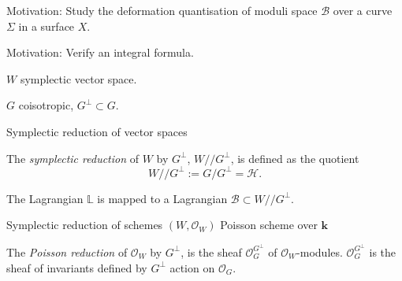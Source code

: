     \frame{\sectionpage}
    
    \begin{frame}
    Motivation: Study the deformation quantisation of moduli space \(\mathcal{B}\) over a curve \(\Sigma\) in a surface \(X\).
    
    \vspace{1em}
    
    Motivation: Verify an integral formula.
    \end{frame}



    \begin{frame}
    \(W\) symplectic vector space.
    
    \(G\) coisotropic, \(G^{\perp} \subset G\).
    \end{frame}


    \begin{frame}{Symplectic reduction of vector spaces}
    
    \begin{defn} The \emph{symplectic reduction} of \(W\) by \(G^{\perp}\), \(W /\!\!/ G^{\perp}\), is defined as the quotient 
    \[ W /\!\!/ G^{\perp} := G/G^\perp = \mathcal{H}. \]
    \end{defn}
    
    \begin{lem} 
    The Lagrangian \( \mathbb{L}\) is mapped to a Lagrangian \( \mathcal{B}  \subset  W /\!\!/ G^{\perp} \). 
    \end{lem}

    
    \end{frame}
    
    
    \begin{frame}{Symplectic reduction of schemes}
    \( (W, \mathcal{O}_W)\) Poisson scheme over \( \mathbf{k}\)

    
    \begin{defn}
    The \emph{Poisson reduction} of \( \mathcal{O}_W\) by \(G^{\perp}\), is the sheaf \( \mathcal{O}_G^{G^{\perp}}\) of \( \mathcal{O}_W\)-modules. \( \mathcal{O}_G^{G^{\perp}}\) is the sheaf of invariants defined by \(G^{\perp}\) action on \( \mathcal{O}_G\).
    \end{defn}
    \end{frame}
    
